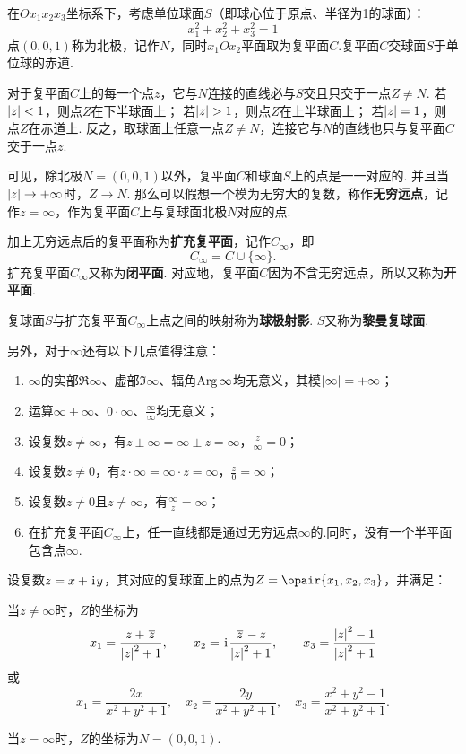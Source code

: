\begin{definition}[复数在复球面上的几何表示]
在\(Ox_1x_2x_3\)坐标系下，考虑单位球面\(S\)（即球心位于原点、半径为1的球面）：\[
x_1^2+x_2^2+x_3^2=1
\]点\((0,0,1)\)称为北极，记作\(N\)，同时\(x_1Ox_2\)平面取为复平面\(C\).复平面\(C\)交球面\(S\)于单位球的赤道.

对于复平面\(C\)上的每一个点\(z\)，它与\(N\)连接的直线必与\(S\)交且只交于一点\(Z \neq N\).
若\(\abs{z} < 1\)，则点\(Z\)在下半球面上；
若\(\abs{z} > 1\)，则点\(Z\)在上半球面上；
若\(\abs{z} = 1\)，则点\(Z\)在赤道上.
反之，取球面上任意一点\(Z \neq N\)，连接它与\(N\)的直线也只与复平面\(C\)交于一点\(z\).

可见，除北极\(N=(0,0,1)\)以外，复平面\(C\)和球面\(S\)上的点是一一对应的.
并且当\(\abs{z} \to +\infty\)时，\(Z \to N\).
那么可以假想一个模为无穷大的复数，称作\textbf{无穷远点}，记作\(z = \infty\)，作为复平面\(C\)上与复球面北极\(N\)对应的点.

加上无穷远点后的复平面称为\textbf{扩充复平面}，记作\(C_{\infty}\)，即\[
C_{\infty} = C \cup \{\infty\}.
\]
扩充复平面\(C_{\infty}\)又称为\textbf{闭平面}.
对应地，复平面\(C\)因为不含无穷远点，所以又称为\textbf{开平面}.

复球面\(S\)与扩充复平面\(C_{\infty}\)上点之间的映射称为\textbf{球极射影}.
\(S\)又称为\textbf{黎曼复球面}.

另外，对于\(\infty\)还有以下几点值得注意：
\begin{enumerate}
\item \(\infty\)的实部\(\Re\infty\)、虚部\(\Im\infty\)、辐角\(\operatorname{Arg}\infty\)均无意义，其模\(\abs{\infty}=+\infty\)；
\item 运算\(\infty \pm \infty\)、\(0 \cdot \infty\)、\(\frac{\infty}{\infty}\)均无意义；
\item 设复数\(z \neq \infty\)，有\(z \pm \infty = \infty \pm z = \infty\)，\(\frac{z}{\infty} = 0\)；
\item 设复数\(z \neq 0\)，有\(z \cdot \infty = \infty \cdot z = \infty\)，\(\frac{z}{0} = \infty\)；
\item 设复数\(z \neq 0\)且\(z \neq \infty\)，有\(\frac{\infty}{z} = \infty\)；
\item 在扩充复平面\(C_{\infty}\)上，任一直线都是通过无穷远点\(\infty\)的.同时，没有一个半平面包含点\(\infty\).
\end{enumerate}
\end{definition}

\begin{theorem}
设复数\(z=x+\kern1pt\mathrm{i}\kern1pt y\)，其对应的复球面上的点为\(Z=\opair{x_1,x_2,x_3}\)，并满足：

当\(z \neq \infty\)时，\(Z\)的坐标为\[
x_1 = \frac{z + \kern1pt\overline{z}\kern1pt}{\abs{z}^2 + 1}, \qquad
x_2 = \kern1pt\mathrm{i}\kern1pt\frac{\kern1pt\overline{z}\kern1pt - z}{\abs{z}^2 + 1}, \qquad
x_3 = \frac{\abs{z}^2 - 1}{\abs{z}^2 + 1}
\]或\[
x_1 = \frac{2x}{x^2+y^2+1}, \quad
x_2 = \frac{2y}{x^2+y^2+1}, \quad
x_3 = \frac{x^2+y^2-1}{x^2+y^2+1}.
\]

当\(z = \infty\)时，\(Z\)的坐标为\(N = (0,0,1)\).
\end{theorem}

